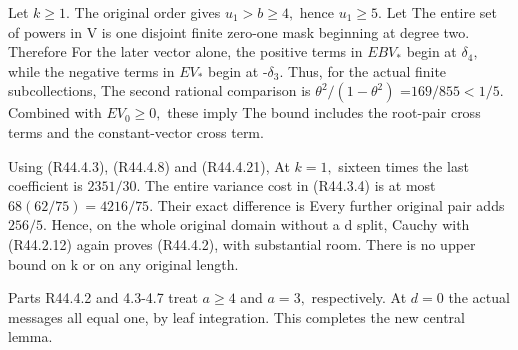 Let \(k\ge 1.\) The original order gives \(u_1>b\ge 4,\allowbreak \) hence \(u_1\ge 5.\)
Let
The entire set of powers in V is one disjoint finite zero-one
mask beginning at degree two. Therefore
For the later vector alone, the positive terms in \(EBV_*\) begin
at \(\delta_4,\allowbreak \) while the negative terms in \(EV_*\) begin at -\(\delta_3.\)
Thus, for the actual finite subcollections,
The second rational comparison is \(\theta^2/(1-\theta^2)\)
=\(169/855<1/5.\) Combined with \(EV_0\ge 0,\allowbreak \) these imply
The bound includes the root-pair cross terms and the constant-vector cross term.

Using (R44.4.3), (R44.4.8) and (R44.4.21),
At \(k=1,\allowbreak \) sixteen times the last coefficient is \(2351/30.\)
The entire variance cost in (R44.3.4) is at most \(68(62/75)=4216/75.\)
Their exact difference is
Every further original pair adds \(256/5.\) Hence, on the whole
original domain without a d split,
Cauchy with (R44.2.12) again proves (R44.4.2), with substantial room.
There is no upper bound on k or on any original length.

Parts R44.4.2 and 4.3-4.7 treat \(a\ge 4\) and \(a=3,\allowbreak \) respectively.
At \(d=0\) the actual messages all equal one, by leaf integration. This completes the new central lemma.


